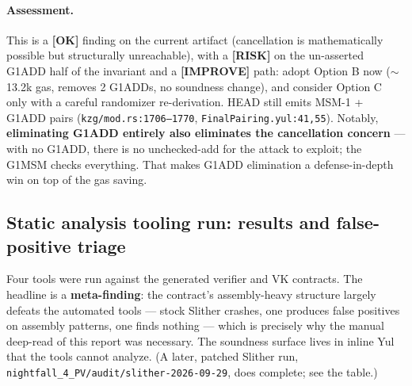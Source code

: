 \paragraph{Assessment.} This is a
\textcolor{tracegreen}{\textbf{[OK]}} finding on the current
artifact (cancellation is mathematically possible but structurally
unreachable), with a
\textcolor{rustorange}{\textbf{[RISK]}} on the un-asserted
G1ADD half of the invariant and a \textcolor{codegenblue}{\textbf{[IMPROVE]}} path:
adopt Option B now ($\sim$13.2k gas, removes 2 G1ADDs, no
soundness change), and consider Option C only with a careful
randomizer re-derivation.  HEAD still emits
MSM-1 + G1ADD pairs (\texttt{kzg/\allowbreak{}mod.rs:1706--1770}, \texttt{FinalPairing.yul:41,55}). Notably,
\textbf{eliminating G1ADD
entirely also eliminates the cancellation concern} --- with no
G1ADD, there is no unchecked-add for the attack to exploit; the
G1MSM checks everything. That makes G1ADD elimination a
defense-in-depth win on top of the gas saving.

\subsection{Static analysis tooling run: results and false-positive triage}
\label{sec:pr-tooling}

Four tools were run against the generated verifier and VK contracts.
The headline is a \textbf{meta-finding}: the contract's
assembly-heavy structure largely defeats the automated tools ---
stock Slither crashes, one produces false positives on assembly patterns,
one finds nothing --- which is precisely why the manual deep-read
of this report was necessary. The soundness surface lives in
inline Yul that the tools cannot analyze. (A later, patched Slither
run, \texttt{nightfall\_\allowbreak{}4\_\allowbreak{}PV/\allowbreak{}audit/\allowbreak{}slither-2026-09-29}, does
complete; see the table.)

